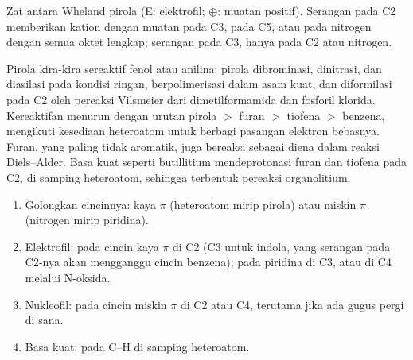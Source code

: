 \begin{omfigure}

{\small Zat antara Wheland pirola (E: elektrofil; $\oplus$: muatan positif).
Serangan pada C2 memberikan kation dengan muatan pada C3, pada C5, atau pada nitrogen dengan semua
oktet lengkap; serangan pada C3, hanya pada C2 atau nitrogen.}
\end{omfigure}

Pirola kira-kira sereaktif fenol atau anilina: pirola dibrominasi, dinitrasi,
dan diasilasi pada kondisi ringan, berpolimerisasi dalam asam kuat, dan
diformilasi pada C2 oleh pereaksi Vilsmeier dari dimetilformamida dan fosforil
klorida. Kereaktifan menurun dengan urutan pirola $>$ furan $>$ tiofena $>$ benzena,
mengikuti kesediaan heteroatom untuk berbagi pasangan elektron bebasnya. Furan,
yang paling tidak aromatik, juga bereaksi sebagai diena dalam reaksi Diels--Alder. Basa
kuat seperti butillitium mendeprotonasi furan dan tiofena pada C2, di samping
heteroatom, sehingga terbentuk pereaksi organolitium.

\begin{method}\label{met:b3:heterocycles:site}
\begin{enumerate}
  \item Golongkan cincinnya: kaya $\pi$ (heteroatom mirip pirola) atau miskin $\pi$
        (nitrogen mirip piridina).
  \item Elektrofil: pada cincin kaya $\pi$ di C2 (C3 untuk indola, yang serangan pada C2-nya
        akan mengganggu cincin benzena); pada piridina di C3, atau di C4 melalui
        N-oksida.
  \item Nukleofil: pada cincin miskin $\pi$ di C2 atau C4, terutama jika ada gugus pergi
        di sana.
  \item Basa kuat: pada C--H di samping heteroatom.
\end{enumerate}
\end{method}

